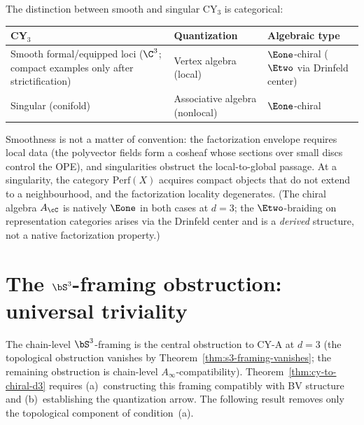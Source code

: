 \begin{remark}
\label{rem:smooth-singular-locality}
The distinction between smooth and singular CY$_3$ is categorical:
\begin{center}
\renewcommand{\arraystretch}{1.2}
\begin{tabular}{lll}
 \toprule
 \textbf{CY$_3$} & \textbf{Quantization} & \textbf{Algebraic type} \\
 \midrule
 Smooth formal/equipped loci ($\C^3$; compact examples only after strictification) & Vertex algebra (local) & $\Eone$-chiral ($\Etwo$ via Drinfeld center) \\
 Singular (conifold) & Associative algebra (nonlocal) & $\Eone$-chiral \\
 \bottomrule
\end{tabular}
\end{center}
Smoothness is not a matter of convention: the factorization envelope requires local data (the polyvector fields form a cosheaf whose sections over small discs control the OPE), and singularities obstruct the local-to-global passage. At a singularity, the category $\mathrm{Perf}(X)$ acquires compact objects that do not extend to a neighbourhood, and the factorization locality degenerates. (The chiral algebra $A_\cC$ is natively $\Eone$ in both cases at $d = 3$; the $\Etwo$-braiding on representation categories arises via the Drinfeld center and is a \emph{derived} structure, not a native factorization property.)
\end{remark}


\section{The \texorpdfstring{$\bS^3$}{S-3}-framing obstruction: universal triviality}
\label{sec:s3-framing}

The chain-level $\bS^3$-framing is the central obstruction to CY-A at
$d = 3$ (the topological obstruction vanishes by
Theorem~\ref{thm:s3-framing-vanishes}; the remaining obstruction is
chain-level $A_\infty$-compatibility). Theorem~\ref{thm:cy-to-chiral-d3}
requires (a)~constructing this framing compatibly with BV structure and
(b)~establishing the quantization arrow. The following result removes
only the topological component of condition~(a).


